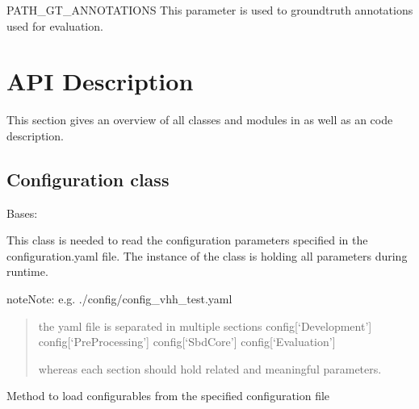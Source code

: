 \documentclass[letterpaper,10pt,english,openany,oneside]{sphinxmanual}
\begin{document}
PATH\_GT\_ANNOTATIONS
This parameter is used to groundtruth annotations used for evaluation.




\chapter{API Description}
\label{\detokenize{index:api-description}}
This section gives an overview of all classes and modules in  as well as an code description.


\section{Configuration class}
\label{\detokenize{Configuration:configuration-class}}\label{\detokenize{Configuration::doc}}

\begin{fulllineitems}
\label{\detokenize{Configuration:sbd.Configuration.Configuration}}
Bases: 

This class is needed to read the configuration parameters specified in the configuration.yaml file.
The instance of the class is holding all parameters during runtime.

\begin{sphinxadmonition}{note}{Note:}
e.g. ./config/config\_vhh\_test.yaml
\begin{quote}

the yaml file is separated in multiple sections
config{[}‘Development’{]}
config{[}‘PreProcessing’{]}
config{[}‘SbdCore’{]}
config{[}‘Evaluation’{]}

whereas each section should hold related and meaningful parameters.
\end{quote}
\end{sphinxadmonition}

\begin{fulllineitems}
\label{\detokenize{Configuration:sbd.Configuration.Configuration.loadConfig}}
Method to load configurables from the specified configuration file

\end{fulllineitems}


\end{fulllineitems}
\end{document}
